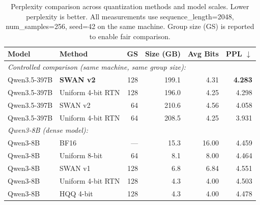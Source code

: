 \begin{table}[t]
\centering
\caption{Perplexity comparison across quantization methods and model scales. Lower perplexity is better. All measurements use sequence\_length=2048, num\_samples=256, seed=42 on the same machine. Group size (GS) is reported to enable fair comparison.}
\label{tab:perplexity}
\begin{tabular}{llrrrr}
\toprule
Model & Method & GS & Size (GB) & Avg Bits & PPL $\downarrow$ \\
\midrule
  \multicolumn{6}{l}{\textit{Controlled comparison (same machine, same group size):}} \\
  Qwen3.5-397B & \textbf{SWAN v2} & 128 & 199.1 & 4.31 & \textbf{4.283} \\
  Qwen3.5-397B & Uniform 4-bit RTN & 128 & 196.0 & 4.25 & 4.298 \\
  Qwen3.5-397B & SWAN v2 & 64 & 210.6 & 4.56 & 4.058 \\
  Qwen3.5-397B & Uniform 4-bit RTN & 64 & 208.5 & 4.25 & 3.931 \\
\midrule
  \multicolumn{6}{l}{\textit{Qwen3-8B (dense model):}} \\
  Qwen3-8B & BF16 & --- & 15.3 & 16.00 & 4.459 \\
  Qwen3-8B & Uniform 8-bit & 64 & 8.1 & 8.00 & 4.464 \\
  Qwen3-8B & SWAN v1 & 128 & 6.8 & 6.84 & 4.551 \\
  Qwen3-8B & Uniform 4-bit RTN & 128 & 4.3 & 4.00 & 4.503 \\
  Qwen3-8B & HQQ 4-bit & 128 & 4.3 & 4.00 & 4.478 \\
\bottomrule
\end{tabular}
\end{table}
